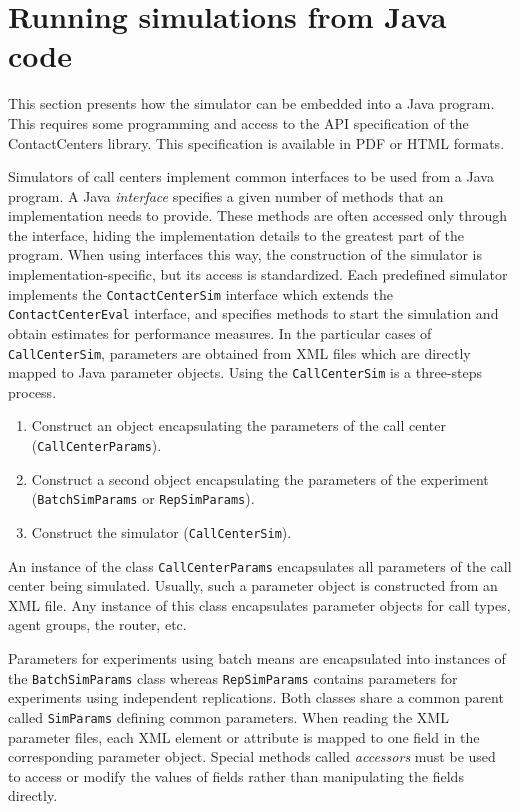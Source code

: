 \section{Running simulations from Java code}
\label{sec:mskusejava}

This section presents how the simulator can be embedded into a Java
program.  This requires some programming and access to the API
specification of the ContactCenters library.  This specification is
available in PDF or HTML formats.

Simulators of call centers implement common interfaces to be used
from a Java program.  A Java \emph{interface} specifies a given
number of methods that an implementation needs to provide.
These methods are often accessed only through the interface,
hiding the implementation details to the greatest part of the
program.
When using interfaces this way,
the construction of the simulator is
implementation-specific, but its access is standardized.  Each predefined
simulator implements the \texttt{Contact\-Center\-Sim} interface which
extends the \texttt{Contact\-Center\-Eval} interface,
and
specifies methods to start the simulation and obtain estimates for
performance measures.
In the particular cases of \texttt{Call\-Center\-Sim},
parameters are obtained from XML files
which are directly mapped to Java parameter objects.
Using the \texttt{CallCenterSim} is a three-steps process.
%
\begin{enumerate}
\item Construct an object encapsulating the parameters of the call center
  (\texttt{CallCenterParams}).
\item Construct a second object encapsulating the parameters of the experiment
  (\texttt{BatchSim\-Params} or \texttt{RepSimParams}).
\item Construct the simulator (\texttt{CallCenterSim}).
\end{enumerate}
%
An instance of the class
\texttt{Call\-Center\-Params} encapsulates all parameters of the
call center being simulated.  Usually, such a parameter object is
constructed from an XML file.
Any instance of this class encapsulates
parameter objects for
call types, agent groups, the router, etc.

Parameters for experiments using batch means are encapsulated into
instances of the  \texttt{Batch\-Sim\-Params} class
whereas \texttt{Rep\-Sim\-Params} contains parameters for experiments
using independent replications.
Both classes share a common parent called \texttt{Sim\-Params}
defining common parameters.
When reading the XML parameter files, each XML element or attribute is
mapped to one field in the corresponding parameter object.
Special methods called \emph{accessors} must be used to access or
modify the values of fields rather than manipulating the fields directly.

